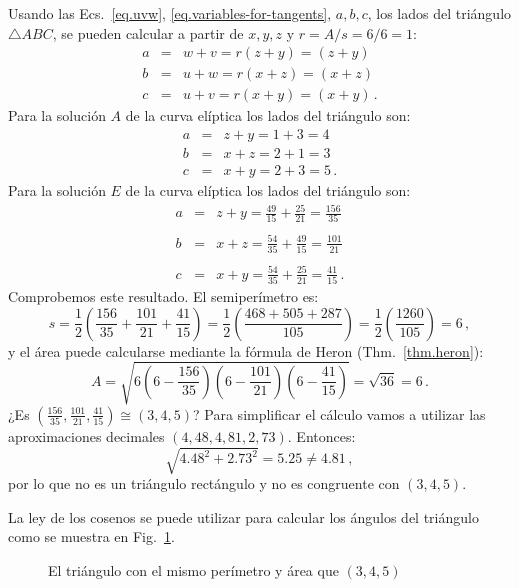 Usando las Ecs.~\ref{eq.uvw}, \ref{eq.variables-for-tangents}, $a,b,c$, los lados del triángulo $\triangle ABC$, se pueden calcular a partir de $x,y,z$ y $r=A/s=6/6=1$:
\begin{eqnarray*}
a&=&w+v = r(z+y)=(z+y)\\
b&=&u+w= r(x+z)=(x+z)\\
c&=&u+v=r(x+y)=(x+y)\,.
\end{eqnarray*}
Para la solución $A$ de la curva elíptica los lados del triángulo son:
\begin{eqnarray*}
a &=& z+y = 1+3 = 4\\
b &=& x+z = 2+1=3\\
c &=& x+y = 2+3=5\,.
\end{eqnarray*}
Para la solución $E$ de la curva elíptica los lados del triángulo son:
\begin{eqnarray*}
a &=& z+y = \frac{49}{15} + \frac{25}{21} = \frac{156}{35}\\
&&\\
b &=& x+z = \frac{54}{35} + \frac{49}{15} = \frac{101}{21}\\
&&\\
c &=& x+y = \frac{54}{35} + \frac{25}{21} =\frac{41}{15}\,.
\end{eqnarray*}
Comprobemos este resultado. El semiperímetro es:
\[
s=\frac{1}{2}\left(\frac{156}{35} + \frac{101}{21}+\frac{41}{15}\right) = \frac{1}{2}\left(\frac{468+505+287}{105}\right) = \frac{1}{2}\left(\frac{1260}{105}\right)= 6\,,
\]
y el área puede calcularse mediante la fórmula de Heron (Thm.~\ref{thm.heron}):
\[
A= \sqrt{6 \left(6-\frac{156}{35}\right) \left(6-\frac{101}{21}\right) \left(6-\frac{41}{15}\right)}=\sqrt{36} = 6\,.
\]
¿Es $\left(\frac{156}{35}, \frac{101}{21}, \frac{41}{15}\right)\cong(3,4,5)$? Para simplificar el cálculo vamos a utilizar las aproximaciones decimales $(4,48,4,81,2,73)$. Entonces:
\[
\sqrt{4.48^2+2.73^2}=5.25\neq 4.81\,,
\]
por lo que no es un triángulo rectángulo y no es congruente con $(3,4,5)$.

La ley de los cosenos se puede utilizar para calcular los ángulos del triángulo como se muestra en Fig.~\ref{f.not-a-right-triangle}.


\begin{figure}[t]
\begin{center}
\end{center}
\caption{El triángulo con el mismo perímetro y área que $(3,4,5)$}\label{f.not-a-right-triangle}
\end{figure}

